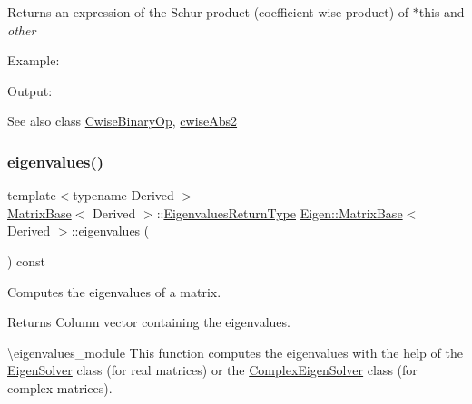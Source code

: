 \begin{DoxyReturn}{Returns}
an expression of the Schur product (coefficient wise product) of $\ast$this and {\itshape other} 
\end{DoxyReturn}
Example\+: 
\begin{DoxyCodeInclude}{0}
\end{DoxyCodeInclude}
 Output\+: 
\begin{DoxyVerbInclude}
\end{DoxyVerbInclude}


\begin{DoxySeeAlso}{See also}
class \mbox{\hyperlink{class_eigen_1_1_cwise_binary_op}{Cwise\+Binary\+Op}}, \mbox{\hyperlink{class_eigen_1_1_matrix_base_a60808fcf09547e14952957bbdf75d3c6}{cwise\+Abs2}} 
\end{DoxySeeAlso}
\mbox{\label{class_eigen_1_1_matrix_base_a30430fa3d5b4e74d312fd4f502ac984d}} 
\subsubsection{\texorpdfstring{eigenvalues()}{eigenvalues()}}
{\footnotesize\ttfamily template$<$typename Derived $>$ \\
\mbox{\hyperlink{class_eigen_1_1_matrix_base}{Matrix\+Base}}$<$ Derived $>$\+::\mbox{\hyperlink{class_eigen_1_1_matrix}{Eigenvalues\+Return\+Type}} \mbox{\hyperlink{class_eigen_1_1_matrix_base}{Eigen\+::\+Matrix\+Base}}$<$ Derived $>$\+::eigenvalues (\begin{DoxyParamCaption}{ }\end{DoxyParamCaption}) const\hspace{0.3cm}{\ttfamily [inline]}}



Computes the eigenvalues of a matrix. 

\begin{DoxyReturn}{Returns}
Column vector containing the eigenvalues.
\end{DoxyReturn}
\textbackslash{}eigenvalues\+\_\+module This function computes the eigenvalues with the help of the \mbox{\hyperlink{class_eigen_1_1_eigen_solver}{Eigen\+Solver}} class (for real matrices) or the \mbox{\hyperlink{class_eigen_1_1_complex_eigen_solver}{Complex\+Eigen\+Solver}} class (for complex matrices).

